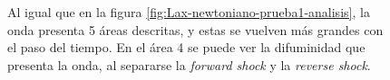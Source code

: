 \documentclass[12pt,a4paper]{book}
\begin{document}
\begin{figure}
\centering
{}
\caption{\label{fig:Lax-prueba2_no_centrado-analisis}Al igual que en la figura \ref{fig:Lax-newtoniano-prueba1-analisis}, la onda presenta 5 áreas descritas, y estas se vuelven más grandes con el paso del tiempo. En el área 4 se puede ver la difuminidad que presenta la onda, al separarse la \emph{forward shock} y la \emph{reverse shock}.} 
\end{figure}
\end{document}

